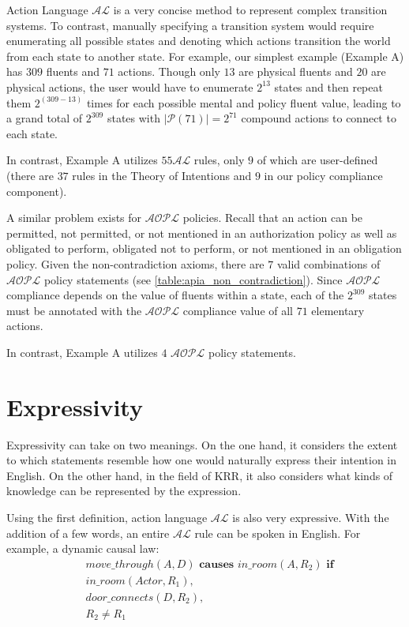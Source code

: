 Action Language $\mathcal{AL}$ is a very concise method to represent complex transition systems.
To contrast, manually specifying a transition system would require enumerating all possible states and denoting which actions transition the world from each state to another state.
For example, our simplest example (Example A) has $309$ fluents and $71$ actions.
Though only $13$ are physical fluents and $20$ are physical actions, the user would have to enumerate $2^{13}$ states and then repeat them $2^{(309-13)}$ times for each possible mental and policy fluent value, leading to a grand total of $2^{309}$ states with $|\mathcal{P}(71)|=2^{71}$ compound actions to connect to each state.

In contrast, Example A utilizes $55$$\mathcal{AL}$ rules, only $9$ of which are user-defined (there are $37$ rules in the Theory of Intentions and $9$ in our policy compliance component).

A similar problem exists for $\mathcal{AOPL}$ policies.
Recall that an action can be permitted, not permitted, or not mentioned in an authorization policy as well as obligated to perform, obligated not to perform, or not mentioned in an obligation policy.
Given the non-contradiction axioms, there are $7$ valid combinations of $\mathcal{AOPL}$ policy statements (see \cref{table:apia_non_contradiction}).
Since $\mathcal{AOPL}$ compliance depends on the value of fluents within a state, each of the $2^{309}$ states must be annotated with the $\mathcal{AOPL}$ compliance value of all $71$ elementary actions.

In contrast, Example A utilizes $4$ $\mathcal{AOPL}$ policy statements.

\section{Expressivity}

Expressivity can take on two meanings.
On the one hand, it considers the extent to which statements resemble how one would naturally express their intention in English.
On the other hand, in the field of KRR, it also considers what kinds of knowledge can be represented by the expression.

Using the first definition, action language $\mathcal{AL}$ is also very expressive.
With the addition of a few words, an entire $\mathcal{AL}$ rule can be spoken in English.
For example, a dynamic causal law:
\begin{equation}
\begin{split}
    & move\_through(A, D) \textbf{ causes } in\_room(A, R_{2}) \textbf{ if} \\
    & in\_room(Actor, R_{1}), \\
    & door\_connects(D, R_{2}), \\
    & R_{2} \neq R_{1}
\end{split}
\end{equation}

